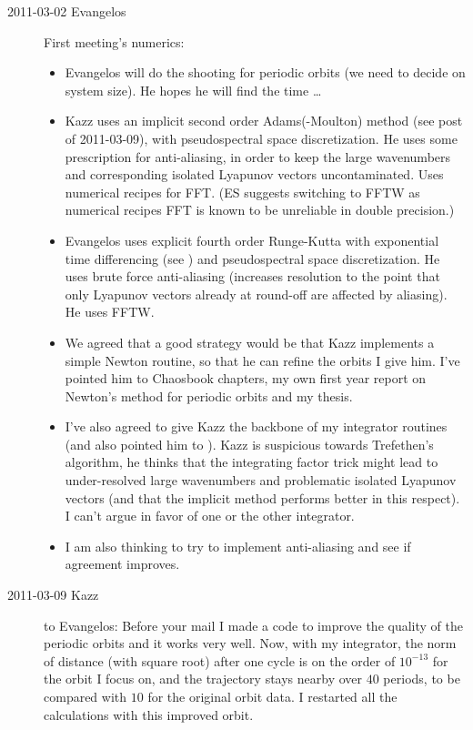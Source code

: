 \begin{description}
\item[2011-03-02 Evangelos] First meeting's numerics:
\begin{itemize}
 \item Evangelos will do the shooting for periodic orbits
	(we need to decide on system size). He hopes he will find the time \ldots
 \item Kazz uses an implicit second order Adams(-Moulton) method (see post of
	2011-03-09), with pseudospectral space discretization.
	He uses some prescription for anti-aliasing, in order to keep the large wavenumbers
	and corresponding isolated Lyapunov vectors uncontaminated. Uses numerical
	recipes for FFT. (ES suggests switching to FFTW as numerical recipes FFT is
	known to be unreliable in double precision.)
 \item Evangelos uses explicit fourth order Runge-Kutta with exponential
	time differencing (see ) and pseudospectral space
	discretization. He uses brute force anti-aliasing (increases resolution
	to the point that only Lyapunov vectors already at round-off are affected by
	aliasing). He uses FFTW.
 \item We agreed that a good strategy would be that Kazz implements a simple
	Newton routine, so that he can refine the orbits I give him. I've
	pointed him to Chaosbook chapters, my own first year report on Newton's
	method for periodic orbits and my thesis.
 \item I've also agreed to give Kazz the backbone of my integrator routines
	(and also pointed him to ). Kazz is suspicious towards
	Trefethen's algorithm, he thinks that the integrating factor trick might
	lead to under-resolved large wavenumbers and problematic isolated
	Lyapunov vectors (and that the implicit method performs better in this
	respect). I can't argue in favor of one or the other integrator.
 \item I am also thinking to try to implement anti-aliasing and see
	if agreement improves.
\end{itemize}

\item[2011-03-09 Kazz] to Evangelos:
Before your mail I made a code to improve the quality of the periodic orbits
and it works very well. Now, with my integrator, the norm of distance
(with square root) after one cycle is on the order of $10^{-13}$ for the orbit
I focus on, and the trajectory stays nearby over $40$ periods, to be compared
with $10$ for the original orbit data. I restarted all the calculations
with this improved orbit.


\end{description}
